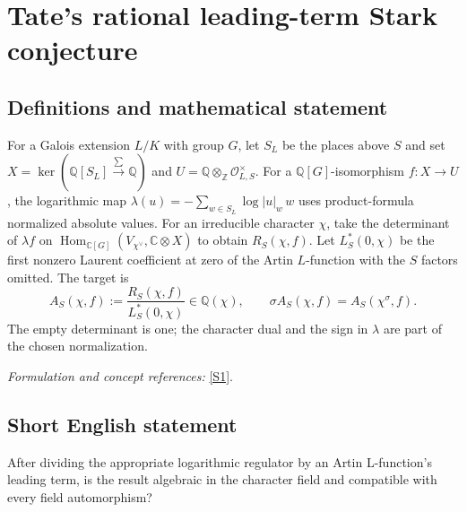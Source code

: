 \documentclass[11pt,a4paper]{article}
\newcommand{\Z}{\mathbb{Z}}
\newcommand{\Q}{\mathbb{Q}}
\newcommand{\C}{\mathbb{C}}
\newcommand{\sref}[2]{\hyperlink{source:#1:#2}{[S#2]}}
\newif\ifshowcatalogue
\newcommand{\cataloguescope}[1]{\ifshowcatalogue
 \paragraph{Exact scope in the supplied catalogue.}
 \begin{quote}\small #1\end{quote}\fi}
\numberwithin{equation}{section}
\begin{document}
\setcounter{section}{0}
\clearpage
\section*{\texorpdfstring{Tate's rational leading-term Stark conjecture}{Tate's rational leading-term Stark conjecture}}\label{statement}
\subsection{Definitions and mathematical statement}
For a Galois extension $L/K$ with group $G$, let $S_L$ be the places above $S$ and set
$X=\ker(\Q[S_L]\xrightarrow{\sum}\Q)$ and
$U=\Q\otimes_{\Z}\mathcal O_{L,S}^{\times}$. For a $\Q[G]$-isomorphism $f:X\to U$, the logarithmic map
$\lambda(u)=-\sum_{w\in S_L}\log|u|_w\,w$
uses product-formula normalized absolute values. For an irreducible character $\chi$, take the determinant of $\lambda f$ on
$\operatorname{Hom}_{\C[G]}(V_{\chi^\vee},\C\otimes X)$ to obtain $R_S(\chi,f)$. Let $L_S^*(0,\chi)$ be the first nonzero Laurent coefficient at zero of the Artin $L$-function with the $S$ factors omitted. The target is
\[
 A_S(\chi,f):=\frac{R_S(\chi,f)}{L_S^*(0,\chi)}\in\Q(\chi),
 \qquad\sigma A_S(\chi,f)=A_S(\chi^\sigma,f).
\]
The empty determinant is one; the character dual and the sign in $\lambda$ are part of the chosen normalization.
\par\smallskip\textit{Formulation and concept references:} \sref{statement}{1}.
\cataloguescope{For every finite Galois extension L/K of number fields with group G, let S be any finite set of places of K containing the archimedean and ramified places. Let X be the augmentation kernel of the free Q-module on places of L above S, U=Q tensor\_Z O\_(L,S)\textasciicircum{}*, and f:X->U any Q[G]-isomorphism. Define lambda:R tensor U->R tensor X by lambda(u)=-sum\_w log|u|\_w w, using product-formula normalized absolute values. For each irreducible complex character chi of G, set R\_S(chi,f)=det\_C(lambda f acting by postcomposition on Hom\_C[G](V\_(dual chi),C tensor X)) and A\_S(chi,f)=R\_S(chi,f)/L\_S\textasciicircum{}*(0,chi), where L\_S\textasciicircum{}* is the first nonzero Laurent coefficient of the S-truncated Artin L-function and an empty determinant is1. Is A\_S(chi,f) in Q(chi), with sigma(A\_S(chi,f))=A\_S(chi\textasciicircum{}sigma,f) for every sigma in Aut(C)?}
\subsection{Short English statement}
After dividing the appropriate logarithmic regulator by an Artin L-function's leading term, is the result algebraic in the character field and compatible with every field automorphism?
\end{document}
